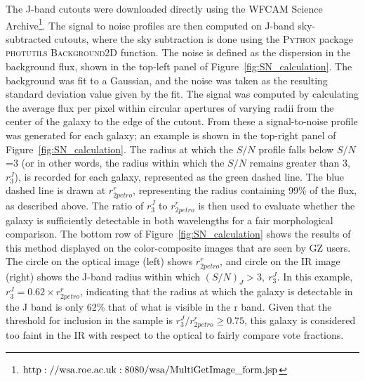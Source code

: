 The J-band cutouts were downloaded directly using the WFCAM Science Archive\footnote{$\rm http://wsa.roe.ac.uk:8080/wsa/MultiGetImage\_form.jsp$}. The signal to noise profiles are then computed on J-band sky-subtracted cutouts, where the sky subtraction is done using the \textsc{Python} package \textsc{photutils Background2D} function. %
The noise is defined as the dispersion in the background flux, shown in the top-left panel of Figure~\ref{fig:SN_calculation}. The background was fit to a Gaussian, and the noise was taken as the resulting standard deviation value given by the fit. The signal was computed by calculating the average flux per pixel within circular apertures of varying radii from the center of the galaxy to the edge of the cutout. From these a signal-to-noise profile was generated for each galaxy; an example is shown in the top-right panel of Figure~\ref{fig:SN_calculation}. The radius at which the $S/N$ profile falls below $S/N$=3 (or in other words, the radius within which the $S/N$ remains greater than 3, $r^{J}_{3}$), is recorded for each galaxy, represented as the green dashed line. The blue dashed line is drawn at $r^{r}_{2petro}$, representing the radius containing 99\% of the flux, as described above. The ratio of $r^{J}_{3}$ to $r^{r}_{2petro}$ is then used to evaluate whether the galaxy is sufficiently detectable in both wavelengths for a fair morphological comparison. The bottom row of Figure~\ref{fig:SN_calculation} shows the results of this method displayed on the color-composite images that are seen by GZ users. The circle on the optical image (left) shows $r^{r}_{2petro}$, and circle on the IR image (right) shows  the J-band radius within which $(S/N)_{J}>3,~r^{J}_3$. In this example, $r^{J}_{3}=0.62\times r^{r}_{2petro}$, indicating that the radius at which the galaxy is detectable in the J band is only 62\% that of what is visible in the r band. Given that the threshold for inclusion in the sample is $r^{J}_{3}/r^{r}_{2petro} \ge 0.75$, this galaxy is considered too faint in the IR with respect to the optical to fairly compare vote fractions.  




